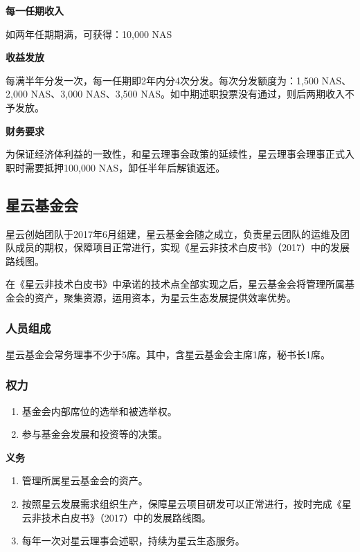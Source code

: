 \textbf{每一任期收入}

如两年任期期满，可获得：10,000 NAS

\textbf{收益发放}

每满半年分发一次，每一任期即2年内分4次分发。每次分发额度为：1,500 NAS、2,000 NAS、3,000 NAS、3,500 NAS。如中期述职投票没有通过，则后两期收入不予发放。

\textbf{财务要求}

为保证经济体利益的一致性，和星云理事会政策的延续性，星云理事会理事正式入职时需要抵押100,000 NAS，卸任半年后解锁返还。


\subsection{星云基金会}

星云创始团队于2017年6月组建，星云基金会随之成立，负责星云团队的运维及团队成员的期权，保障项目正常进行，实现《星云非技术白皮书》（2017）中的发展路线图。

在《星云非技术白皮书》中承诺的技术点全部实现之后，星云基金会将管理所属基金会的资产，聚集资源，运用资本，为星云生态发展提供效率优势。

\subsubsection{人员组成}

星云基金会常务理事不少于5席。其中，含星云基金会主席1席，秘书长1席。

\subsubsection{权力}

\begin{enumerate}
	\item 基金会内部席位的选举和被选举权。
	\item 参与基金会发展和投资等的决策。
\end{enumerate}

\textbf{义务}

\begin{enumerate}
	\item 管理所属星云基金会的资产。
	\item 按照星云发展需求组织生产，保障星云项目研发可以正常进行，按时完成《星云非技术白皮书》（2017）中的发展路线图。
	\item 每年一次对星云理事会述职，持续为星云生态服务。
\end{enumerate}

